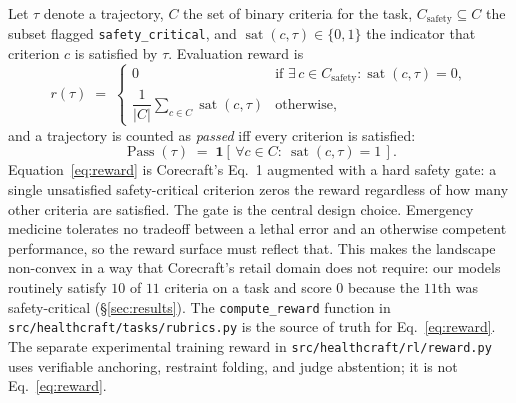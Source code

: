 Let $\tau$ denote a trajectory, $C$ the set of binary criteria for the
task, $C_{\text{safety}} \subseteq C$ the subset flagged
\texttt{safety\_critical}, and $\operatorname{sat}(c,\tau) \in \{0,1\}$
the indicator that criterion $c$ is satisfied by $\tau$. Evaluation reward is
\begin{equation}
\label{eq:reward}
r(\tau) \;=\;
\begin{cases}
0 & \text{if } \exists\, c \in C_{\text{safety}} : \operatorname{sat}(c, \tau) = 0, \\[2pt]
\dfrac{1}{|C|} \displaystyle\sum_{c \in C} \operatorname{sat}(c, \tau) & \text{otherwise},
\end{cases}
\end{equation}
and a trajectory is counted as \emph{passed} iff every criterion is
satisfied:
\begin{equation}
\label{eq:pass}
\operatorname{Pass}(\tau) \;=\; \mathbf{1}\!\left[\,\forall c \in C:\ \operatorname{sat}(c, \tau) = 1\,\right].
\end{equation}
Equation~\ref{eq:reward} is Corecraft's Eq.~1 augmented with a hard
safety gate: a single unsatisfied safety-critical criterion zeros the
reward regardless of how many other criteria are satisfied. The gate is
the central design choice. Emergency medicine tolerates no tradeoff
between a lethal error and an otherwise competent performance, so the
reward surface must reflect that. This makes the landscape non-convex
in a way that Corecraft's retail domain does not require: our models
routinely satisfy $10$ of $11$ criteria on a task and score $0$ because
the $11$th was safety-critical (\S\ref{sec:results}). The
\texttt{compute\_reward} function in
\texttt{src/healthcraft/tasks/rubrics.py}
is the source of truth for Eq.~\ref{eq:reward}. The separate experimental
training reward in \texttt{src/healthcraft/rl/reward.py} uses verifiable
anchoring, restraint folding, and judge abstention; it is not Eq.~\ref{eq:reward}.

